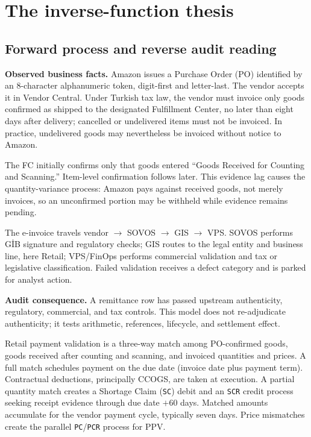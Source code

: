 \documentclass[11pt,a4paper]{article}
\theoremstyle{definition}
\begin{document}
\section{The inverse-function thesis}
\subsection{Forward process and reverse audit reading}

\textbf{Observed business facts.} Amazon issues a Purchase Order (PO)
identified by an 8-character alphanumeric token, digit-first and
letter-last. The vendor accepts it in Vendor Central. Under Turkish tax
law, the vendor must invoice only goods confirmed as shipped to the
designated Fulfillment Center, no later than eight days after delivery;
cancelled or undelivered items must not be invoiced. In practice,
undelivered goods may nevertheless be invoiced without notice to Amazon.

The FC initially confirms only that goods entered ``Goods Received for
Counting and Scanning.'' Item-level confirmation follows later. This
evidence lag causes the quantity-variance process: Amazon pays against
received goods, not merely invoices, so an unconfirmed portion may be
withheld while evidence remains pending.

The e-invoice travels vendor $\to$ SOVOS $\to$ GIS $\to$ VPS. SOVOS
performs GİB signature and regulatory checks; GIS routes to the legal
entity and business line, here Retail; VPS/FinOps performs commercial
validation and tax or legislative classification. Failed validation
receives a defect category and is parked for analyst action.

\textbf{Audit consequence.} A remittance row has passed upstream
authenticity, regulatory, commercial, and tax controls. This model does
not re-adjudicate authenticity; it tests arithmetic, references,
lifecycle, and settlement effect.

Retail payment validation is a three-way match among PO-confirmed goods,
goods received after counting and scanning, and invoiced quantities and
prices. A full match schedules payment on the due date (invoice date plus
payment term). Contractual deductions, principally CCOGS, are taken at
execution. A partial quantity match creates a Shortage Claim
(\texttt{SC}) debit and an \texttt{SCR} credit process seeking receipt
evidence through due date $+60$ days. Matched amounts accumulate for the
vendor payment cycle, typically seven days. Price mismatches create the
parallel \texttt{PC}/\texttt{PCR} process for PPV.
\end{document}
